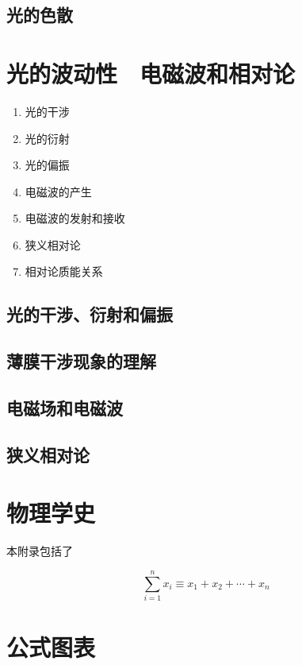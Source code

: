 \documentclass[cn,11pt, simple]{elegantbook}
\begin{document}
\clearpage\section{光的色散}

\chapter{光的波动性　电磁波和相对论}
\begin{enumerate}
   \item 光的干涉
   \item 光的衍射
   \item 光的偏振
   \item 电磁波的产生
   \item 电磁波的发射和接收
   \item 狭义相对论
   \item 相对论质能关系
\end{enumerate}

\clearpage\section{光的干涉、衍射和偏振}

\clearpage\section{薄膜干涉现象的理解}

\clearpage\section{电磁场和电磁波}

\clearpage\section{狭义相对论}



\nocite{*} 



\appendix
\chapter{物理学史}

本附录包括了

\begin{equation}
\sum_{i=1}^n x_i \equiv x_1 + x_2 +\cdots + x_n
\end{equation}



\chapter{公式图表}
\end{document}
